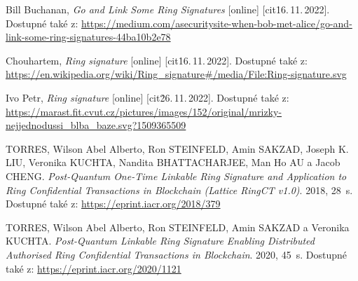 \begin{thebibliography}{99}
  Bill Buchanan,
  \textit{Go and Link Some Ring Signatures}\/  [online]
  [cit\.16.\,11.\,2022]. 
  Dostupné také z: 
  \url{https://medium.com/asecuritysite-when-bob-met-alice/go-and-link-some-ring-signatures-44ba10b2e78}
  
  Chouhartem,
  \textit{Ring signature}\/  [online]
  [cit\.16.\,11.\,2022]. 
  Dostupné také z: 
  \url{https://en.wikipedia.org/wiki/Ring_signature#/media/File:Ring-signature.svg}
    
  Ivo Petr,
  \textit{Ring signature}\/  [online]
  [cit\.26.\,11.\,2022]. 
  Dostupné také z: 
  \url{https://marast.fit.cvut.cz/pictures/images/152/original/mrizky-nejjednodussi_blba_baze.svg?1509365509}
  
  TORRES, Wilson Abel Alberto, Ron STEINFELD, Amin SAKZAD, Joseph K. LIU, Veronika KUCHTA, Nandita BHATTACHARJEE, Man Ho AU a Jacob CHENG. \textit{Post-Quantum One-Time Linkable Ring Signature and Application to Ring Confidential Transactions in Blockchain (Lattice RingCT v1.0)}. 2018, 28~s. Dostupné také z: \url{https://eprint.iacr.org/2018/379}
  
  TORRES, Wilson Abel Alberto, Ron STEINFELD, Amin SAKZAD a Veronika KUCHTA. \textit{Post-Quantum Linkable Ring Signature Enabling Distributed Authorised Ring Confidential Transactions in Blockchain}. 2020, 45~s. Dostupné také z: \url{https://eprint.iacr.org/2020/1121}
  
  
\end{thebibliography}
